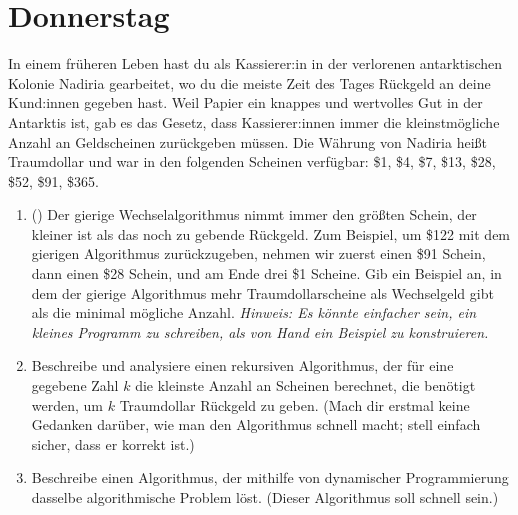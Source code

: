 \documentclass{uebung_cs}
\begin{document}
\section*{Donnerstag}

\begin{aufgabe}
    In einem früheren Leben hast du als Kassierer:in in der verlorenen antarktischen Kolonie Nadiria gearbeitet, wo du die meiste Zeit des Tages Rückgeld an deine Kund:innen gegeben hast.
    Weil Papier ein knappes und wertvolles Gut in der Antarktis ist, gab es das Gesetz, dass Kassierer:innen immer die kleinstmögliche Anzahl an Geldscheinen zurückgeben müssen.
    Die Währung von Nadiria heißt Traumdollar und war in den folgenden Scheinen verfügbar:
    \$1,
    \$4,
    \$7,
    \$13,
    \$28,
    \$52,
    \$91,
    \$365.
    \begin{enumerate}
        \item(\warmup) Der gierige Wechselalgorithmus nimmt immer den größten Schein, der kleiner ist als das noch zu gebende Rückgeld. Zum Beispiel, um \$122 mit dem gierigen Algorithmus zurückzugeben, nehmen wir zuerst einen \$91 Schein, dann einen \$28 Schein, und am Ende drei \$1 Scheine. Gib ein Beispiel an, in dem der gierige Algorithmus mehr Traumdollarscheine als Wechselgeld gibt als die minimal mögliche Anzahl. \emph{Hinweis: Es könnte einfacher sein, ein kleines Programm zu schreiben, als von Hand ein Beispiel zu konstruieren.}
        \item Beschreibe und analysiere einen rekursiven Algorithmus, der für eine gegebene Zahl $k$ die kleinste Anzahl an Scheinen berechnet, die benötigt werden, um $k$ Traumdollar Rückgeld zu geben. (Mach dir erstmal keine Gedanken darüber, wie man den Algorithmus schnell macht; stell einfach sicher, dass er korrekt ist.)
        \item Beschreibe einen Algorithmus, der mithilfe von dynamischer Programmierung dasselbe algorithmische Problem löst. (Dieser Algorithmus soll schnell sein.)
    \end{enumerate}
\end{aufgabe}
\end{document}
